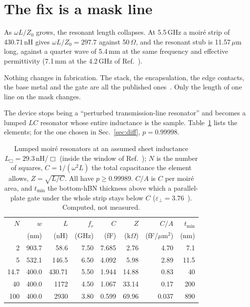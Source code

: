 \documentclass[aps,prb,reprint,superscriptaddress,longbibliography]{revtex4-2}
\begin{document}
\section{The fix is a mask line}
\label{sec:fix}

As $\omega L/Z_0$ grows, the resonant length collapses. At 5.5\,GHz a
moir\'e strip of 430.71\,nH gives $\omega L/Z_0 = 297.7$ against
50\,$\Omega$, and the resonant stub is 11.57\,$\mu$m long, against a
quarter wave of 5.4\,mm at the same frequency and effective permittivity
(7.1\,mm at the 4.2\,GHz of Ref.~\cite{Tanaka2025}).

Nothing changes in fabrication. The stack, the encapsulation, the edge
contacts, the base metal and the gate are all the published
ones~\cite{Tanaka2025,Zaman2026}. Only the length of one line on the
mask changes.

The device stops being a ``perturbed transmission-line resonator'' and
becomes a lumped $LC$ resonator whose entire inductance is the sample.
Table~\ref{tab:design} lists the elements; for the one chosen in
Sec.~\ref{sec:diff}, $p = 0.99998$.

\begin{table}[!tbp]
\caption{\label{tab:design}Lumped moir\'e resonators at an assumed sheet
inductance $L_\Box = 29.3$\,nH/$\Box$ (inside the window of
Ref.~\cite{Jha2025}); $N$ is the number of squares, $C = 1/(\omega^2
L)$ the total capacitance the element allows, $Z = \sqrt{L/C}$. All
have $p \geq 0.99989$. $C/A$ is $C$ per moir\'e area, and $t_{\min}$ the
bottom-hBN thickness above which a parallel-plate gate under the whole
strip stays below $C$ ($\varepsilon_\perp = 3.76$~\cite{Laturia2018}).
Computed, not measured.}
\begin{ruledtabular}
\begin{tabular}{rrrrrrrr}
$N$ & $w$ & $L$ & $f_r$ & $C$ & $Z$ & $C/A$ & $t_{\min}$ \\
 & (nm) & (nH) & (GHz) & (fF) & (k$\Omega$) & (fF/$\mu$m$^2$) & (nm) \\
\hline
2    & 903.7 & 58.6   & 7.50 & 7.685 & 2.76  & 4.70  & 7.1 \\
5    & 532.1 & 146.5  & 6.50 & 4.092 & 5.98  & 2.89  & 11.5 \\
14.7 & 400.0 & 430.71 & 5.50 & 1.944 & 14.88 & 0.83  & 40 \\
40   & 400.0 & 1172   & 4.50 & 1.067 & 33.14 & 0.17  & 200 \\
100  & 400.0 & 2930   & 3.80 & 0.599 & 69.96 & 0.037 & 890 \\
\end{tabular}
\end{ruledtabular}
\end{table}
\end{document}
